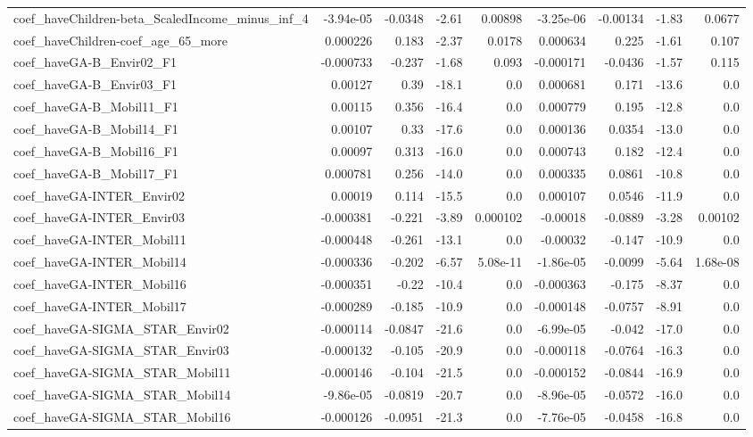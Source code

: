 \begin{tabular}{lrrrrrrrr}
coef_haveChildren-beta_ScaledIncome_minus_inf_4 & -3.94e-05 & -0.0348 & -2.61 & 0.00898 & -3.25e-06 & -0.00134 & -1.83 & 0.0677 \\
coef_haveChildren-coef_age_65_more & 0.000226 & 0.183 & -2.37 & 0.0178 & 0.000634 & 0.225 & -1.61 & 0.107 \\
coef_haveGA-B_Envir02_F1 & -0.000733 & -0.237 & -1.68 & 0.093 & -0.000171 & -0.0436 & -1.57 & 0.115 \\
coef_haveGA-B_Envir03_F1 & 0.00127 & 0.39 & -18.1 & 0.0 & 0.000681 & 0.171 & -13.6 & 0.0 \\
coef_haveGA-B_Mobil11_F1 & 0.00115 & 0.356 & -16.4 & 0.0 & 0.000779 & 0.195 & -12.8 & 0.0 \\
coef_haveGA-B_Mobil14_F1 & 0.00107 & 0.33 & -17.6 & 0.0 & 0.000136 & 0.0354 & -13.0 & 0.0 \\
coef_haveGA-B_Mobil16_F1 & 0.00097 & 0.313 & -16.0 & 0.0 & 0.000743 & 0.182 & -12.4 & 0.0 \\
coef_haveGA-B_Mobil17_F1 & 0.000781 & 0.256 & -14.0 & 0.0 & 0.000335 & 0.0861 & -10.8 & 0.0 \\
coef_haveGA-INTER_Envir02 & 0.00019 & 0.114 & -15.5 & 0.0 & 0.000107 & 0.0546 & -11.9 & 0.0 \\
coef_haveGA-INTER_Envir03 & -0.000381 & -0.221 & -3.89 & 0.000102 & -0.00018 & -0.0889 & -3.28 & 0.00102 \\
coef_haveGA-INTER_Mobil11 & -0.000448 & -0.261 & -13.1 & 0.0 & -0.00032 & -0.147 & -10.9 & 0.0 \\
coef_haveGA-INTER_Mobil14 & -0.000336 & -0.202 & -6.57 & 5.08e-11 & -1.86e-05 & -0.0099 & -5.64 & 1.68e-08 \\
coef_haveGA-INTER_Mobil16 & -0.000351 & -0.22 & -10.4 & 0.0 & -0.000363 & -0.175 & -8.37 & 0.0 \\
coef_haveGA-INTER_Mobil17 & -0.000289 & -0.185 & -10.9 & 0.0 & -0.000148 & -0.0757 & -8.91 & 0.0 \\
coef_haveGA-SIGMA_STAR_Envir02 & -0.000114 & -0.0847 & -21.6 & 0.0 & -6.99e-05 & -0.042 & -17.0 & 0.0 \\
coef_haveGA-SIGMA_STAR_Envir03 & -0.000132 & -0.105 & -20.9 & 0.0 & -0.000118 & -0.0764 & -16.3 & 0.0 \\
coef_haveGA-SIGMA_STAR_Mobil11 & -0.000146 & -0.104 & -21.5 & 0.0 & -0.000152 & -0.0844 & -16.9 & 0.0 \\
coef_haveGA-SIGMA_STAR_Mobil14 & -9.86e-05 & -0.0819 & -20.7 & 0.0 & -8.96e-05 & -0.0572 & -16.0 & 0.0 \\
coef_haveGA-SIGMA_STAR_Mobil16 & -0.000126 & -0.0951 & -21.3 & 0.0 & -7.76e-05 & -0.0458 & -16.8 & 0.0 \\

\end{tabular}
